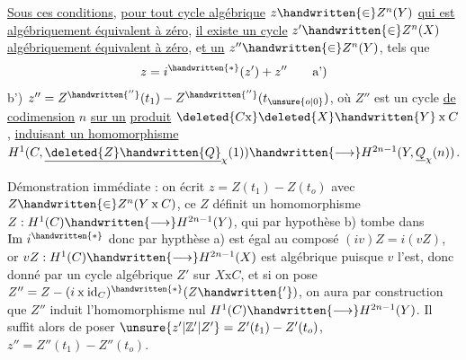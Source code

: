 \uline{Sous ces conditions}, \uline{pour tout cycle algébrique} $z\handwritten{\in}Z^n(Y)$ \uline{qui est algébriquement équivalent à zéro}, \uline{il existe un cycle} $z'\handwritten{\in}Z^n(X)$ \uline{algébriquement équivalent à zéro}, e\uline{t un} $z''\handwritten{\in}Z^n(Y)$, tels que
\[
z=i^{\handwritten{*}}(z')+z''\tag*{a')}
\]
b')\quad {} $z''=Z^{\handwritten{''}}(t_1)-Z^{\handwritten{''}}(t_{\unsure{o|0}})$, où $Z''$ est un cycle \uline{de codimension} $n$ \uline{sur un} \uline{produit} $\deleted{C\mathrm{x}}\deleted{X}\handwritten{Y}\mathbin{\mathrm{x}}C$, \uline{induisant un homomorphisme}   $H^1(C,\underline{\deleted{Z}\handwritten{Q}}_{\chi}(1))\handwritten{\longrightarrow}H^{2n-1}(Y,\underline{Q}_{\chi}(n))$.

Démonstration immédiate : on écrit $z=Z(t_1)-Z(t_o)$ avec $Z\handwritten{\in}Z^n(Y\mathbin{\mathrm{x}}C)$, ce $Z$ définit un homomorphisme $Z:H^1(C)\handwritten{\longrightarrow}H^{2n-1}(Y)$,  qui par hypothèse b) tombe dans $\mathrm{Im}\ i^{\handwritten{*}}$ donc par hypthèse a) est égal au composé $(iv)Z=i(vZ)$, or $vZ:H^1(C)\handwritten{\longrightarrow}H^{2n-1}(X)$ est algébrique puisque $v$ l'est, donc donné par un cycle algébrique $Z'$ sur $X\mathbin{\mathrm{x}}C$, et si on pose $Z''=Z-(i\mathbin{\mathrm{x}}\mathrm{id}_C)^{\handwritten{*}}(Z\handwritten{'} )$, on aura par construction que $Z''$ induit l'homomorphisme nul $H^1(C)\handwritten{\longrightarrow}H^{2n-1}(Y)$.  Il suffit alors de poser $\unsure{z'|\mathbb{Z}'|Z'}=Z'(t_1)-Z'(t_o)$, $z''=Z''(t_1)-Z''(t_o)$.

